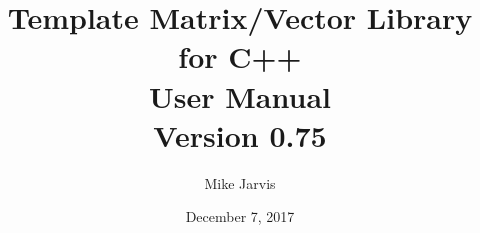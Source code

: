 \documentclass[twoside,letterpaper,11pt]{article}
\newcommand{\tmvversion}{0.75}
\begin{document}
\title{Template Matrix/Vector Library for C++ \\ User Manual \\ Version \tmvversion}
\author{Mike Jarvis}
\date{December 7, 2017}
\maketitle

\tableofcontents

\newpage


\newpage


\newpage


\newpage


\newpage


\newpage


\newpage


\newpage


\newpage


\newpage


\newpage


\newpage


\newpage


\newpage


\newpage


\newpage


\newpage


\newpage


\newpage


\newpage
\printindex
\end{document}
